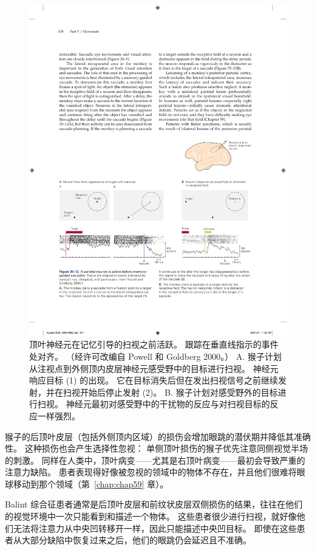 \begin{figure}[htbp]
	\centering
	\includegraphics[width=0.95\linewidth]{chap35/fig_35_12}
	\caption{顶叶神经元在记忆引导的扫视之前活跃。 跟踪在垂直线指示的事件处对齐。 （经许可改编自 Powell 和 Goldberg 2000。） A. 猴子计划从注视点到外侧顶内皮层神经元感受野中的目标进行扫视。 神经元响应目标 (1) 的出现。 它在目标消失后但在发出扫视信号之前继续发射，并在扫视开始后停止发射 (2)。 B. 猴子计划对感受野外的目标进行扫视。 神经元最初对感受野中的干扰物的反应与对扫视目标的反应一样强烈。}
	\label{fig:35_12}
\end{figure}



猴子的后顶叶皮层（包括外侧顶内区域）的损伤会增加眼跳的潜伏期并降低其准确性。 这种损伤也会产生选择性忽视：
单侧顶叶损伤的猴子优先注意同侧视觉半场的刺激。 同样在人类中，顶叶病变——尤其是右顶叶病变——最初会导致严重的注意力缺陷。
患者表现得好像被忽视的领域中的物体不存在，并且他们很难将眼球移动到那个领域（第~\ref{chap:chap59} 章）。


Balint 综合征患者通常是后顶叶皮层和前纹状皮层双侧损伤的结果，往往在他们的视觉环境中一次只能看到和描述一个物体。
这些患者很少进行扫视，就好像他们无法将注意力从中央凹转移开一样，因此只能描述中央凹目标。
即使在这些患者从大部分缺陷中恢复过来之后，他们的眼跳仍会延迟且不准确。


